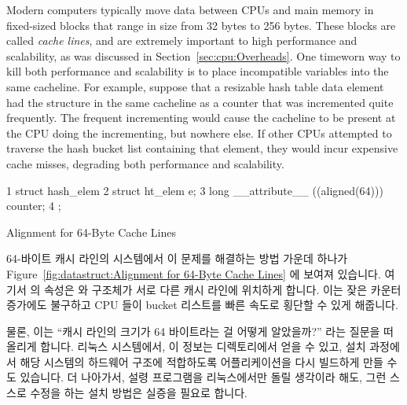 Modern computers typically move data between CPUs and main memory in
fixed-sized blocks that range in size from 32 bytes to 256 bytes.
These blocks are called \emph{cache lines}, and are extremely important
to high performance and scalability, as was discussed in
Section~\ref{sec:cpu:Overheads}.
One timeworn way to kill both performance and scalability is to
place incompatible variables into the same cacheline.
For example, suppose that a resizable hash table data element had
the  structure in the same cacheline as a counter that
was incremented quite frequently.
The frequent incrementing would cause the cacheline to be present at
the CPU doing the incrementing, but nowhere else.
If other CPUs attempted to traverse the hash bucket list containing
that element, they would incur expensive cache misses, degrading both
performance and scalability.
\fi

\begin{listing}[tb]
{ \scriptsize
\begin{verbbox}
1 struct hash_elem {
2   struct ht_elem e;
3   long __attribute__ ((aligned(64))) counter;
4 };
\end{verbbox}
}
\centering
\theverbbox
\caption{Alignment for 64-Byte Cache Lines}
\label{lst:datastruct:Alignment for 64-Byte Cache Lines}
\end{listing}

64-바이트 캐시 라인의 시스템에서 이 문제를 해결하는 방법 가운데 하나가
Figure~\ref{fig:datastruct:Alignment for 64-Byte Cache Lines} 에 보여져
있습니다.
여기서 \GCC 의  속성은  와  구조체가
서로 다른 캐시 라인에 위치하게 합니다.
이는 잦은 카운터 증가에도 불구하고 CPU 들이 bucket 리스트를 빠른 속도로 횡단할
수 있게 해줍니다.

물론, 이는 ``캐시 라인의 크기가 64 바이트라는 걸 어떻게 알았을까?'' 라는 질문을
떠올리게 합니다.
리눅스 시스템에서, 이 정보는 
디렉토리에서 얻을 수 있고, 설치 과정에서 해당 시스템의 하드웨어 구조에
적합하도록 어플리케이션을 다시 빌드하게 만들 수도 있습니다.
더 나아가서, 설령 프로그램을 리눅스에서만 돌릴 생각이라 해도, 그런 스스로
수정을 하는 설치 방법은 실증을 필요로 합니다.
\iffalse

